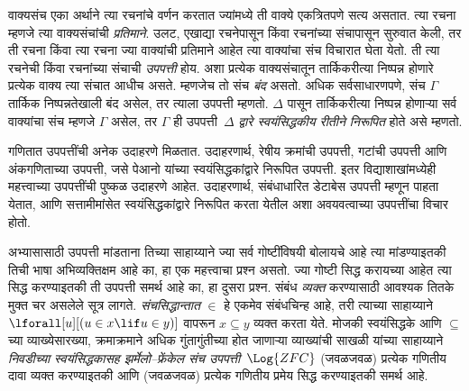 वाक्यसंच एका अर्थाने त्या रचनांचे वर्णन करतात ज्यांमध्ये ती वाक्ये एकत्रितपणे सत्य असतात. त्या रचना म्हणजे त्या वाक्यसंचांची \emph{प्रतिमाने}. उलट, एखाद्या रचनेपासून किंवा रचनांच्या संचापासून सुरुवात केली, तर ती रचना किंवा त्या रचना ज्या वाक्यांची प्रतिमाने आहेत त्या वाक्यांचा संच विचारात घेता येतो. ती त्या रचनेची किंवा रचनांच्या संचाची \emph{उपपत्ती} होय. अशा प्रत्येक वाक्यसंचातून तार्किकरीत्या निष्पन्न होणारे प्रत्येक वाक्य त्या संचात आधीच असते. म्हणजेच तो संच \emph{बंद} असतो. अधिक सर्वसाधारणपणे, संच $\Gamma$ तार्किक निष्पन्नतेखाली बंद असेल, तर त्याला उपपत्ती म्हणतो. $\Delta$ पासून तार्किकरीत्या निष्पन्न होणाऱ्या सर्व वाक्यांचा संच म्हणजे $\Gamma$ असेल, तर $\Gamma$ ही उपपत्ती~$\Delta$ \emph{द्वारे स्वयंसिद्धकीय रीतीने निरूपित} होते असे म्हणतो.

गणितात उपपत्तींची अनेक उदाहरणे मिळतात. उदाहरणार्थ, रेषीय क्रमांची उपपत्ती, गटांची उपपत्ती आणि अंकगणिताच्या उपपत्ती, जसे पेआनो यांच्या स्वयंसिद्धकांद्वारे निरूपित उपपत्ती. इतर विद्याशाखांमध्येही महत्त्वाच्या उपपत्तींची पुष्कळ उदाहरणे आहेत. उदाहरणार्थ, संबंधाधारित डेटाबेस उपपत्ती म्हणून पाहता येतात, आणि सत्तामीमांसेत स्वयंसिद्धकांद्वारे निरूपित करता येतील अशा अवयवत्वाच्या उपपत्तींचा विचार होतो.

अभ्यासासाठी उपपत्ती मांडताना तिच्या साहाय्याने ज्या सर्व गोष्टींविषयी बोलायचे आहे त्या मांडण्याइतकी तिची भाषा अभिव्यक्तिक्षम आहे का, हा एक महत्त्वाचा प्रश्न असतो. ज्या गोष्टी सिद्ध करायच्या आहेत त्या सिद्ध करण्याइतकी ती उपपत्ती समर्थ आहे का, हा दुसरा प्रश्न. संबंध \emph{व्यक्त} करण्यासाठी आवश्यक तितके मुक्त चर असलेले सूत्र लागते. \emph{संचसिद्धान्तात} $\in$ हे एकमेव संबंधचिन्ह आहे, तरी त्याच्या साहाय्याने $\lforall[u][(u \in x \lif u \in y)]$ वापरून $x \subseteq y$ व्यक्त करता येते. मोजकी स्वयंसिद्धके आणि $\subseteq$ च्या व्याख्येसारख्या, क्रमाक्रमाने अधिक गुंतागुंतीच्या होत जाणाऱ्या व्याख्यांची साखळी यांच्या साहाय्याने \emph{निवडीच्या स्वयंसिद्धकासह झर्मेलो--फ्रेंकेल संच उपपत्ती}~$\Log{ZFC}$ (जवळजवळ) प्रत्येक गणितीय दावा व्यक्त करण्याइतकी आणि (जवळजवळ) प्रत्येक गणितीय प्रमेय सिद्ध करण्याइतकी समर्थ आहे.
